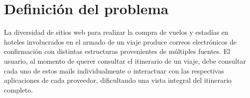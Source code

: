 \FloatBarrier{}
\section{Definición del problema}%
\label{sec:problem}

La diversidad de sitios web para realizar la compra de vuelos y estadías en hoteles involucrados en el armado de un
viaje produce correos electrónicos de confirmación con distintas estructuras provenientes de múltiples fuentes.
El usuario, al momento de querer consultar el itinerario de un viaje, debe consultar cada uno de estos mails
individualmente o interactuar con las respectivas aplicaciones de cada proveedor, dificultando una vista integral del
itinerario completo.